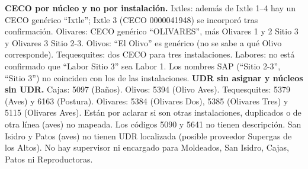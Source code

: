 \documentclass[10pt]{article}
\begin{document}
\begin{lnotas}
 \textbf{CECO por núcleo y no por instalación.} Ixtles: además de Ixtle 1--4 hay un CECO genérico ``Ixtle''; Ixtle 3 (CECO 0000041948) se incorporó tras confirmación. Olivares: CECO genérico ``OLIVARES'', más Olivares 1 y 2 Sitio 3 y Olivares 3 Sitio 2-3. Olivos: ``El Olivo'' es genérico (no se sabe a qué Olivo corresponde). Tequesquites: dos CECO para tres instalaciones. Labores: no está confirmado que ``Labor Sitio 3'' sea Labor 1. Los nombres SAP (``Sitio 2-3'', ``Sitio 3'') no coinciden con los de las instalaciones.
 \textbf{UDR sin asignar y núcleos sin UDR.} Cajas: 5097 (Baños). Olivos: 5394 (Olivo Aves). Tequesquites: 5379 (Aves) y 6163 (Postura). Olivares: 5384 (Olivares Dos), 5385 (Olivares Tres) y 5115 (Olivares Aves). Están por aclarar si son otras instalaciones, duplicados o de otra línea (aves) no mapeada. Los códigos 5090 y 5641 no tienen descripción. San Isidro y Patos (aves) no tienen UDR localizada (posible proveedor Supergas de los Altos). No hay supervisor ni encargado para Moldeados, San Isidro, Cajas, Patos ni Reproductoras.
\end{lnotas}
\end{document}
